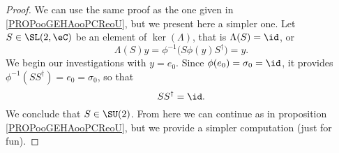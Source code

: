 \begin{proof}
	We can use the same proof as the one given in \ref{PROPooGEHAooPCReoU}, but we present here a simpler one. Let \( S\in \SL(2,\eC)\) be an element of \( \ker(\Lambda)\), that is \( \Lambda(S)=\id\), or
	\begin{equation}
		\Lambda(S)y=\phi^{-1}\big( S\phi(y)S^{\dag} \big)=y.
	\end{equation}
	We begin our investigations with \( y=e_0\). Since \( \phi(e_0)=\sigma_0=\id\), it provides \( \phi^{-1}(SS^{\dag})=e_0=\sigma_0\), so that
	\begin{equation}
		SS^{\dag}=\id.
	\end{equation}
	We conclude that \( S\in \SU(2)\). From here we can continue as in proposition \ref{PROPooGEHAooPCReoU}, but we provide a simpler computation (just for fun).


\end{proof}
